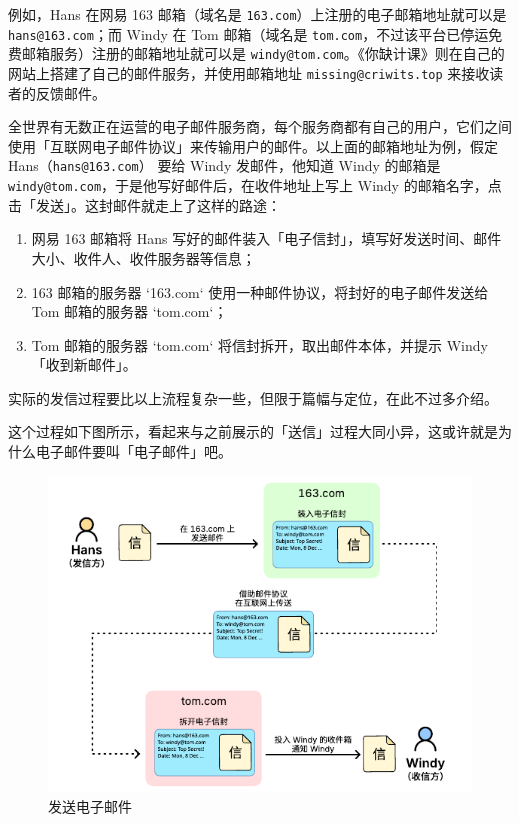 例如，Hans 在网易 163 邮箱（域名是 \texttt{163.com}）上注册的电子邮箱地址就可以是 \texttt{hans@163.com}\MailExample；而 Windy 在 Tom 邮箱（域名是 \texttt{tom.com}，不过该平台已停运免费邮箱服务）注册的邮箱地址就可以是 \texttt{windy@tom.com}\MailExample。《你缺计课》则在自己的网站上搭建了自己的邮件服务，并使用邮箱地址 \texttt{missing@criwits.top} 来接收读者的反馈邮件。

全世界有无数正在运营的电子邮件服务商，每个服务商都有自己的用户，它们之间使用「互联网电子邮件协议」来传输用户的邮件。以上面的邮箱地址为例，假定 Hans（\texttt{hans@163.com}） 要给 Windy 发邮件，他知道 Windy 的邮箱是 \texttt{windy@tom.com}，于是他写好邮件后，在收件地址上写上 Windy 的邮箱名字，点击「发送」。这封邮件就走上了这样的路途：

\begin{enumerate}
  \item 网易 163 邮箱将 Hans 写好的邮件装入「电子信封」，填写好发送时间、邮件大小、收件人、收件服务器等信息；
  \item 163 邮箱的服务器 `163.com` 使用一种邮件协议，将封好的电子邮件发送给 Tom 邮箱的服务器 `tom.com`；
  \item Tom 邮箱的服务器 `tom.com` 将信封拆开，取出邮件本体，并提示 Windy「收到新邮件」。
\end{enumerate}

\begin{note}
  实际的发信过程要比以上流程复杂一些，但限于篇幅与定位，在此不过多介绍。
\end{note}

这个过程如下图所示，看起来与之前展示的「送信」过程大同小异，这或许就是为什么电子邮件要叫「电子邮件」吧。

\begin{figure}[htb!]
  \centering
  \includegraphics[width=.7\textwidth]{assets/software/E_mail.pdf}
  \caption{发送电子邮件}
  \label{fig:E_mail}
\end{figure}

